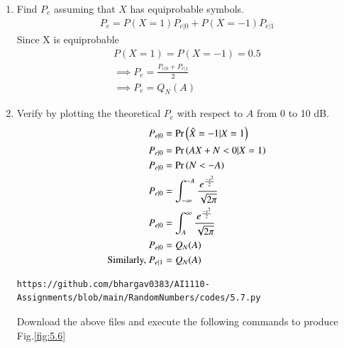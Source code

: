 \documentclass[journal,12pt,twocolumn]{IEEEtran}
\renewcommand\thesection{\arabic{section}}
\begin{document}
\begin{enumerate}[label=\thesection.\arabic*
,ref=\thesection.\theenumi]
\solution
Download the following files and execute the  C program.
\begin{lstlisting}
https://github.com/bhargav0383/AI1110-Assignments/blob/main/RandomNumbers/codes/5.5.c
https://github.com/bhargav0383/AI1110-Assignments/blob/main/RandomNumbers/codes/functions.h
\end{lstlisting}
Download the above files and execute the following commands to get the result
\begin{lstlisting}
$ gcc 5.5.c
$ ./a.out
\end{lstlisting}
\begin{align}
P_{e|0}=0.499035\\
P_{e|1}=0.500176
\end{align}
\item Find $P_e$ assuming that $X$ has equiprobable symbols.\\
\solution
\begin{align}
    P_e=P(X=1)P_{e|0}+P(X=-1)P_{e|1}
\end{align}
Since X is equiprobable
\begin{align}
    P(X=1)=P(X=-1)=0.5\\
    \implies P_e=\frac{P_{e|0}+P_{e|1}}{2}\\
    \implies \boxed{P_e=Q_N(A)}
\end{align}
\item Verify by plotting  the theoretical $P_e$ with respect to $A$ from 0 to 10 dB. \\
\solution
\begin{align}
    P_{e|0}&=\Pr\left(\hat{X}=-1|X=1\right)\\
    P_{e|0}&=\Pr\left(AX+N<0|X=1\right)\\
    P_{e|0}&=\Pr\left(N<-A\right)\\
    P_{e|0}&=\int_{-\infty }^{-A}\frac{e^{\frac{-x^2}{2}}}{\sqrt{2\pi}}\\
    P_{e|0}&=\int_{A }^{\infty}\frac{e^{\frac{-x^2}{2}}}{\sqrt{2\pi}}\\
    P_{e|0}&=Q_N(A)\\
    \text{Similarly, }P_{e|1}&=Q_N(A)
\end{align}
\begin{lstlisting}
https://github.com/bhargav0383/AI1110-Assignments/blob/main/RandomNumbers/codes/5.7.py
\end{lstlisting}
Download the above files and execute the following commands to produce Fig.\ref{fig:5.6}
\begin{lstlisting}

\end{lstlisting}
\end{enumerate}
\end{document}
